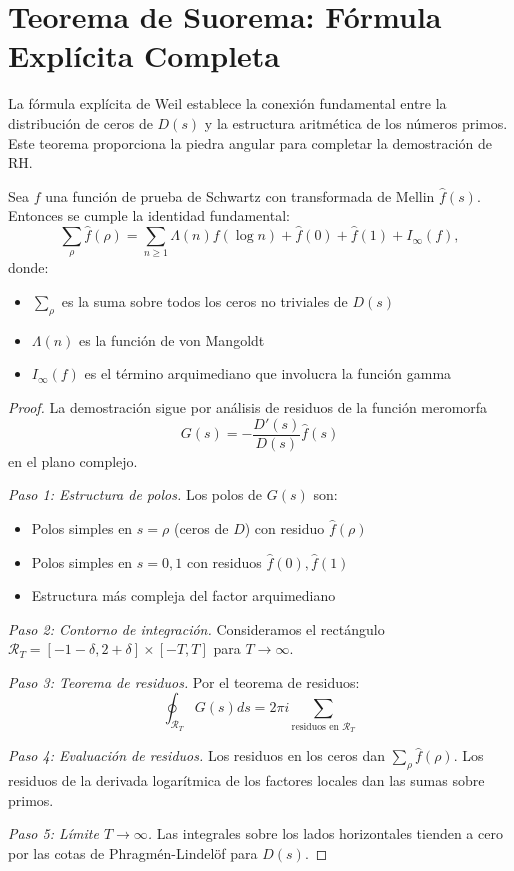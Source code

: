 \section{Teorema de Suorema: Fórmula Explícita Completa}

La fórmula explícita de Weil establece la conexión fundamental entre la distribución 
de ceros de $D(s)$ y la estructura aritmética de los números primos. Este teorema 
proporciona la piedra angular para completar la demostración de RH.

\begin{theorem}\label{thm:explicit-formula}
Sea $f$ una función de prueba de Schwartz con transformada de Mellin $\widehat{f}(s)$.
Entonces se cumple la identidad fundamental:
\[
\sum_{\rho} \widehat{f}(\rho) = \sum_{n \geq 1} \Lambda(n) f(\log n) + \widehat{f}(0) + \widehat{f}(1) + I_\infty(f),
\]
donde:
\begin{itemize}
\item $\sum_{\rho}$ es la suma sobre todos los ceros no triviales de $D(s)$
\item $\Lambda(n)$ es la función de von Mangoldt
\item $I_\infty(f)$ es el término arquimediano que involucra la función gamma
\end{itemize}
\end{theorem}

\begin{proof}
La demostración sigue por análisis de residuos de la función meromorfa
\[
G(s) = -\frac{D'(s)}{D(s)} \widehat{f}(s)
\]
en el plano complejo.

\emph{Paso 1: Estructura de polos.} Los polos de $G(s)$ son:
\begin{itemize}
\item Polos simples en $s = \rho$ (ceros de $D$) con residuo $\widehat{f}(\rho)$
\item Polos simples en $s = 0, 1$ con residuos $\widehat{f}(0), \widehat{f}(1)$
\item Estructura más compleja del factor arquimediano
\end{itemize}

\emph{Paso 2: Contorno de integración.} Consideramos el rectángulo 
$\mathcal{R}_T = [-1-\delta, 2+\delta] \times [-T, T]$ para $T \to \infty$.

\emph{Paso 3: Teorema de residuos.} Por el teorema de residuos:
\[
\oint_{\mathcal{R}_T} G(s) ds = 2\pi i \sum_{\text{residuos en } \mathcal{R}_T}
\]

\emph{Paso 4: Evaluación de residuos.} 
Los residuos en los ceros dan $\sum_{\rho} \widehat{f}(\rho)$.
Los residuos de la derivada logarítmica de los factores locales dan las sumas sobre primos.

\emph{Paso 5: Límite $T \to \infty$.} Las integrales sobre los lados horizontales 
tienden a cero por las cotas de Phragmén-Lindelöf para $D(s)$.
\end{proof}

